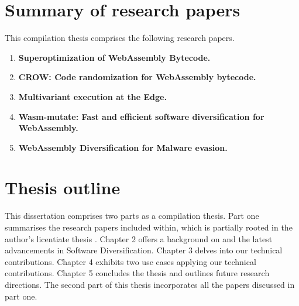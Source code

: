 \section{Summary of research papers}

This compilation thesis comprises the following research papers.

\begin{enumerate}[label={\textbf{P\arabic*}:}, ref={P\arabic*}]
	\item \label{superoptimizerpaper} \textbf{Superoptimization of WebAssembly Bytecode.} \\ 
	 \lipsum[1]
	\item \label{crowpaper} \textbf{CROW: Code randomization for WebAssembly bytecode.} \\ 
	 \lipsum[1]
	\item \label{mewepaper} \textbf{Multivariant execution at the Edge. } \\ 
	 \lipsum[1]
	\item \label{wasmmutatepaper} \textbf{ Wasm-mutate: Fast and efficient software diversification for WebAssembly. }\\ 
	 \lipsum[1]
	\item \label{evasionpaper} \textbf{WebAssembly Diversification for Malware evasion.} \\ 
	 \lipsum[1]
 
\end{enumerate}



\section{Thesis outline}
This dissertation comprises two parts as a compilation thesis. 
Part one summarises the research papers included within, which is partially rooted in the author's licentiate thesis \cite{Lic}. 
Chapter 2 offers a background on \Wasm and the latest advancements in Software Diversification. 
Chapter 3 delves into our technical contributions. 
Chapter 4 exhibits two use cases applying our technical contributions. 
Chapter 5 concludes the thesis and outlines future research directions. 
The second part of this thesis incorporates all the papers discussed in part one.

